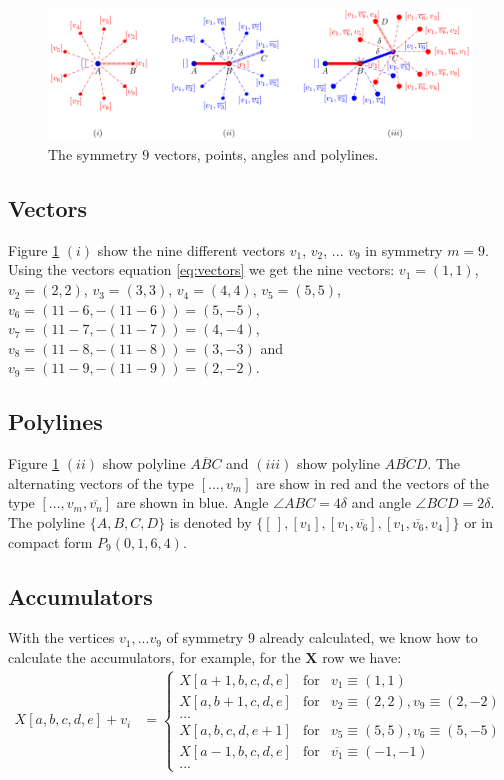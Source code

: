 \documentclass[11pt]{article}
\begin{document}
\begin{figure}[H]
\centering
\includegraphics[scale=1]{vectors-a}
\caption{The symmetry $9$ vectors, points, angles and polylines.}
\label{fig:vectors-a}
\end{figure}

\subsection{Vectors}

Figure \ref{fig:vectors-a} $(i)$ show the nine different vectors $v_1$, $v_2$, ... $v_9$ in symmetry $m=9$. Using the vectors equation \ref{eq:vectors} we get the nine vectors:
$v_1 = (1,1)$,
$v_2 = (2,2)$,
$v_3 = (3,3)$,
$v_4 = (4,4)$,
$v_5 = (5,5)$,
$v_6 = (11-6,-(11-6)) = (5,-5)$,
$v_7 = (11-7,-(11-7)) = (4,-4)$,
$v_8 = (11-8,-(11-8)) = (3,-3)$ and
$v_9 = (11-9,-(11-9)) = (2,-2)$.

\subsection{Polylines}

Figure \ref{fig:vectors-a} $(ii)$ show polyline $\overline{ABC}$ and $(iii)$ show polyline $\overline{ABCD}$. The alternating vectors of the type $[...,v_m]$ are show in red and the vectors of the type $[...,v_m,\overline{v_n}]$ are shown in blue. Angle $\angle{ABC} = 4\delta$ and angle $\angle{BCD} = 2\delta$. The polyline $\{A,B,C,D\}$ is denoted by $\{ [\hspace{2pt}], [v_1], [v_1, \overline{v_6}], [v_1,\overline{v_6},v_4] \}$ or in compact form $P_9(0,1,6,4)$.

\subsection{Accumulators}

With the vertices $v_1,...v_9$ of symmetry $9$ already calculated, we know how to calculate the accumulators, for example, for the $\textbf{X}$ row we have:
\begin{align}
X[a,b,c,d,e] + v_i &= \left\{ \begin{array}{ccl}
 X[a+1,b,c,d,e] & \mbox{for} & v_1\equiv(1,1) \\
 X[a,b+1,c,d,e] & \mbox{for} & v_2\equiv(2,2), v_9\equiv(2,-2)\\
 ... & & \\
 X[a,b,c,d,e+1] & \mbox{for} & v_5\equiv(5,5), v_6\equiv(5,-5)\\
 X[a-1,b,c,d,e] & \mbox{for} & \overline{v_1}\equiv(-1,-1) \\
 ... & &
 \end{array}\right.
\end{align}
\end{document}
